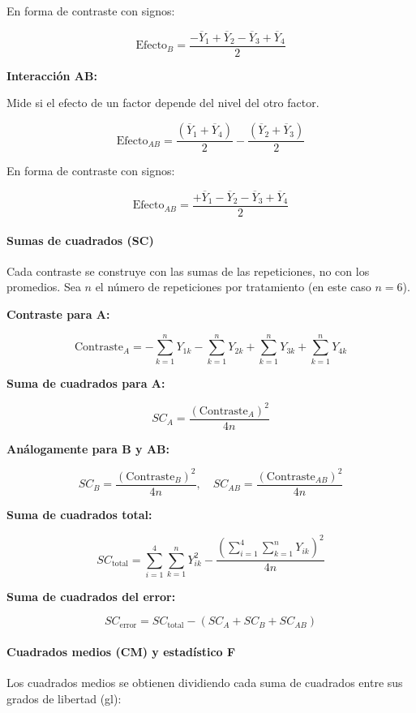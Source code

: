 En forma de contraste con signos:

\[
\text{Efecto}_B = \frac{-\overline{Y}_1 + \overline{Y}_2 - \overline{Y}_3 + \overline{Y}_4}{2}
\]

\textbf{Interacción AB:}

Mide si el efecto de un factor depende del nivel del otro factor.

\[
\text{Efecto}_{AB} = \frac{(\overline{Y}_1 + \overline{Y}_4)}{2} - \frac{(\overline{Y}_2 + \overline{Y}_3)}{2}
\]

En forma de contraste con signos:

\[
\text{Efecto}_{AB} = \frac{+\overline{Y}_1 - \overline{Y}_2 - \overline{Y}_3 + \overline{Y}_4}{2}
\]

\paragraph{Sumas de cuadrados (SC)}

Cada contraste se construye con las sumas de las repeticiones, no con los promedios. Sea $n$ el número de repeticiones por tratamiento (en este caso $n=6$).

\textbf{Contraste para A:}

\[
\text{Contraste}_A = -\sum_{k=1}^{n} Y_{1k} -\sum_{k=1}^{n} Y_{2k} +\sum_{k=1}^{n} Y_{3k} +\sum_{k=1}^{n} Y_{4k}
\]

\textbf{Suma de cuadrados para A:}

\[
SC_A = \frac{(\text{Contraste}_A)^2}{4n}
\]

\textbf{Análogamente para B y AB:}

\[
SC_B = \frac{(\text{Contraste}_B)^2}{4n}, \quad SC_{AB} = \frac{(\text{Contraste}_{AB})^2}{4n}
\]

\textbf{Suma de cuadrados total:}

\[
SC_{\text{total}} = \sum_{i=1}^{4} \sum_{k=1}^{n} Y_{ik}^2 - \frac{(\sum_{i=1}^{4} \sum_{k=1}^{n} Y_{ik})^2}{4n}
\]

\textbf{Suma de cuadrados del error:}

\[
SC_{\text{error}} = SC_{\text{total}} - (SC_A + SC_B + SC_{AB})
\]

\paragraph{Cuadrados medios (CM) y estadístico F}

Los cuadrados medios se obtienen dividiendo cada suma de cuadrados entre sus grados de libertad (gl):

